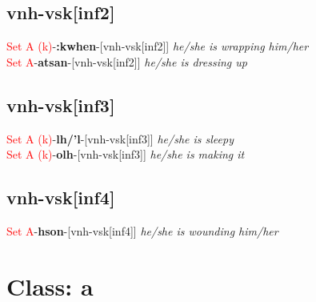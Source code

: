 \documentclass[oneside,openany]{book}%
\begin{document}
\subsection*{vnh-vsk[inf2]}%
\textcolor{Red}{Set A (k)}{-}\textbf{:kwhen}{-}[vnh-vsk[inf2]] \textit{ he/she is wrapping him/her} \\%
\textcolor{Red}{Set A}{-}\textbf{atsan}{-}[vnh-vsk[inf2]] \textit{ he/she is dressing up} \\%
\vspace{1em}%
\needspace{1in}%
\subsection*{vnh-vsk[inf3]}%
\textcolor{Red}{Set A (k)}{-}\textbf{lh/'l}{-}[vnh-vsk[inf3]] \textit{ he/she is sleepy} \\%
\textcolor{Red}{Set A (k)}{-}\textbf{olh}{-}[vnh-vsk[inf3]] \textit{ he/she is making it} \\%
\vspace{1em}%
\needspace{1in}%
\subsection*{vnh-vsk[inf4]}%
\textcolor{Red}{Set A}{-}\textbf{hson}{-}[vnh-vsk[inf4]] \textit{ he/she is wounding him/her} \\%
\vspace{1em}%
\needspace{3in}%
\section*{Class: a}%
%
\needspace{1in}%
\end{document}
